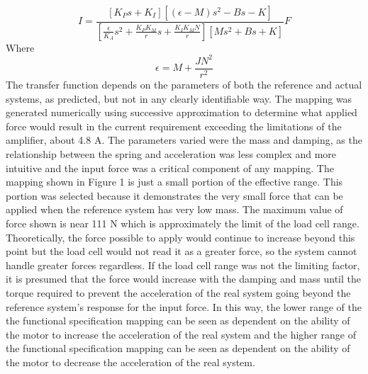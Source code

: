\begin{equation}
I = \frac{[K_{P}s+K_{I}][(\epsilon-M)s^{2}-Bs-K]}{[\frac{\epsilon}{K_{A}}s^{2}+\frac{K_{P}K_{M}}{r}s+\frac{K_{I}K_{M}N}{r}][Ms^{2}+Bs+K]}F
\end{equation}
Where 
\begin{equation}
\epsilon = M+\frac{JN^{2}}{r^{2}}
\end{equation}
\newline \indent The transfer function depends on the parameters of both the reference and actual systems, as predicted, but not in any clearly identifiable way. The mapping was generated numerically using successive approximation to determine what applied force would result in the current requirement exceeding the limitations of the amplifier, about 4.8 A. The parameters varied were the mass and damping, as the relationship between the spring and acceleration was less complex and more intuitive and the input force was a critical component of any mapping.
\newline \indent The mapping shown in Figure 1 is just a small portion of the effective range. This portion was selected because it demonstrates the very small force that can be applied when the reference system has very low mass. The maximum value of force shown is near 111 N which is approximately the limit of the load cell range. Theoretically, the force possible to apply would continue to increase beyond this point but the load cell would not read it as a greater force, so the system cannot handle greater forces regardless. If the load cell range was not the limiting factor, it is presumed that the force would increase with the damping and mass until the torque required to prevent the acceleration of the real system going beyond the reference system's response for the input force. In this way, the lower range of the the functional specification mapping can be seen as dependent on the ability of the motor to increase the acceleration of the real system and the higher range of the functional specification mapping can be seen as dependent on the ability of the motor to decrease the acceleration of the real system.